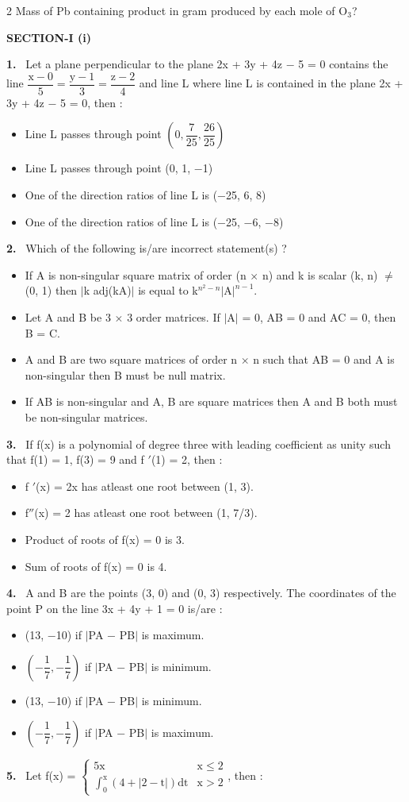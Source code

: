 \documentclass[10pt]{extarticle}
\newcommand{\partsec}[2]{\par\medskip\noindent{\large\bfseries PART-#1: #2}\par\smallskip}
\newcommand{\sect}[1]{\par\smallskip\noindent\textbf{#1}\par}
\newcommand{\qn}[1]{\par\smallskip\noindent\textbf{#1.}~}
\newenvironment{qoptions}{\begin{itemize}[leftmargin=1.8em,itemsep=1pt,topsep=2pt,label={}]}{\end{itemize}}
\newcommand{\opt}[2]{\item[(#1)] #2}
\begin{document}
\begin{multicols}{2}
Mass of Pb containing product in gram produced by each mole of O$_3$?\par
[Molecular weight : Pb = 207, S = 32, O = 16]
\partsec{3}{MATHEMATICS}
\sect{SECTION-I (i)}
\qn{1} Let a plane perpendicular to the plane 2x + 3y + 4z $-$ 5 = 0 contains the line $\dfrac{\text{x}-0}{5} = \dfrac{\text{y}-1}{3} = \dfrac{\text{z}-2}{4}$ and line L where line L is contained in the plane 2x + 3y + 4z $-$ 5 = 0, then :
\begin{qoptions}
\opt{A}{Line L passes through point $\left(0, \dfrac{7}{25}, \dfrac{26}{25}\right)$}
\opt{B}{Line L passes through point (0, 1, $-$1)}
\opt{C}{One of the direction ratios of line L is ($-$25, 6, 8)}
\opt{D}{One of the direction ratios of line L is ($-$25, $-$6, $-$8)}
\end{qoptions}
\qn{2} Which of the following is/are incorrect statement(s) ?
\begin{qoptions}
\opt{A}{If A is non-singular square matrix of order (n $\times$ n) and k is scalar (k, n) $\neq$ (0, 1) then $|$k adj(kA)$|$ is equal to k$^{n^2-n}|$A$|^{n-1}$.}
\opt{B}{Let A and B be 3 $\times$ 3 order matrices. If $|$A$|$ = 0, AB = 0 and AC = 0, then B = C.}
\opt{C}{A and B are two square matrices of order n $\times$ n such that AB = 0 and A is non-singular then B must be null matrix.}
\opt{D}{If AB is non-singular and A, B are square matrices then A and B both must be non-singular matrices.}
\end{qoptions}
\qn{3} If f(x) is a polynomial of degree three with leading coefficient as unity such that f(1) = 1, f(3) = 9 and f $'$(1) = 2, then :
\begin{qoptions}
\opt{A}{f $'$(x) = 2x has atleast one root between (1, 3).}
\opt{B}{f$''$(x) = 2 has atleast one root between (1, 7/3).}
\opt{C}{Product of roots of f(x) = 0 is 3.}
\opt{D}{Sum of roots of f(x) = 0 is 4.}
\end{qoptions}
\qn{4} A and B are the points (3, 0) and (0, 3) respectively. The coordinates of the point P on the line 3x + 4y + 1 = 0 is/are :
\begin{qoptions}
\opt{A}{(13, $-$10) if $|$PA $-$ PB$|$ is maximum.}
\opt{B}{$\left(-\dfrac{1}{7}, -\dfrac{1}{7}\right)$ if $|$PA $-$ PB$|$ is minimum.}
\opt{C}{(13, $-$10) if $|$PA $-$ PB$|$ is minimum.}
\opt{D}{$\left(-\dfrac{1}{7}, -\dfrac{1}{7}\right)$ if $|$PA $-$ PB$|$ is maximum.}
\end{qoptions}
\qn{5} Let f(x) = $\begin{cases} 5\text{x} & \text{x} \leq 2 \\ \displaystyle\int_0^{\text{x}} (4 + |2 - \text{t}|)\text{dt} & \text{x} > 2 \end{cases}$, then :

\end{multicols}
\end{document}
